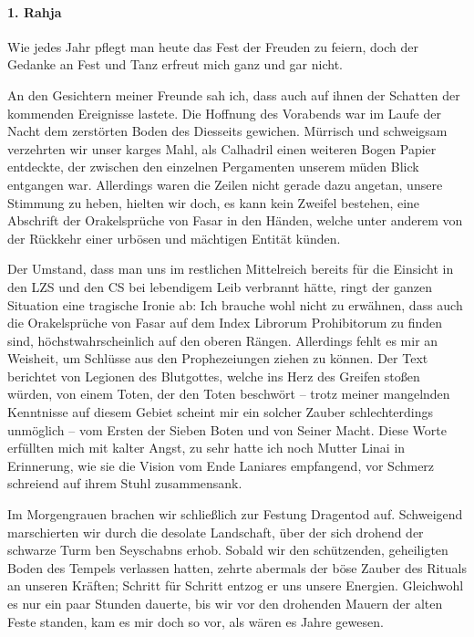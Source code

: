 \paragraph{1. Rahja} Wie jedes Jahr pflegt man heute das Fest der Freuden zu feiern, doch der Gedanke an Fest und Tanz erfreut mich ganz und gar nicht.\par

An den Gesichtern meiner Freunde sah ich, dass auch auf ihnen der Schatten der kommenden Ereignisse lastete. Die Hoffnung des Vorabends war im Laufe der Nacht dem zerstörten Boden des Diesseits gewichen. Mürrisch und schweigsam verzehrten wir unser karges Mahl, als Calhadril einen weiteren Bogen Papier entdeckte, der zwischen den einzelnen Pergamenten unserem müden Blick entgangen war. Allerdings waren die Zeilen nicht gerade dazu angetan, unsere Stimmung zu heben, hielten wir doch, es kann kein Zweifel bestehen, eine Abschrift der Orakelsprüche von Fasar in den Händen, welche unter anderem von der Rückkehr einer urbösen und mächtigen Entität künden.\par

Der Umstand, dass man uns im restlichen Mittelreich bereits für die Einsicht in den LZS und den CS bei lebendigem Leib verbrannt hätte, ringt der ganzen Situation eine tragische Ironie ab: Ich brauche wohl nicht zu erwähnen, dass auch die Orakelsprüche von Fasar auf dem Index Librorum Prohibitorum zu finden sind, höchstwahrscheinlich auf den oberen Rängen. Allerdings fehlt es mir an Weisheit, um Schlüsse aus den Prophezeiungen ziehen zu können. Der Text berichtet von Legionen des Blutgottes, welche ins Herz des Greifen stoßen würden, von einem Toten, der den Toten beschwört -- trotz meiner mangelnden Kenntnisse auf diesem Gebiet scheint mir ein solcher Zauber schlechterdings unmöglich -- vom Ersten der Sieben Boten und von Seiner Macht. Diese Worte erfüllten mich mit kalter Angst, zu sehr hatte ich noch Mutter Linai in Erinnerung, wie sie die Vision vom Ende Laniares empfangend, vor Schmerz schreiend auf ihrem Stuhl zusammensank.\par

Im Morgengrauen brachen wir schließlich zur Festung Dragentod auf. Schweigend marschierten wir durch die desolate Landschaft, über der sich drohend der schwarze Turm ben Seyschabns erhob. Sobald wir den schützenden, geheiligten Boden des Tempels verlassen hatten, zehrte abermals der böse Zauber des Rituals an unseren Kräften; Schritt für Schritt entzog er uns unsere Energien. Gleichwohl es nur ein paar Stunden dauerte, bis wir vor den drohenden Mauern der alten Feste standen, kam es mir doch so vor, als wären es Jahre gewesen. \par

